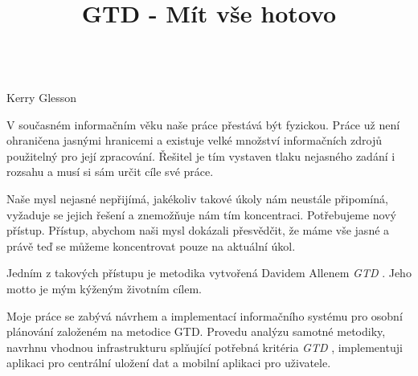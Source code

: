 \documentclass[thesis=B,czech]{FITthesis}[2012/06/26]
\title{GTD - Mít vše hotovo}
\newcommand{\GTD}{\textit{GTD }}
\begin{document}
 


\todototoc
\listoftodos



\begin{introduction}
\begin{center}
\textit{}\\
Kerry Glesson
\end{center}

V současném informačním věku naše práce přestává být fyzickou. Práce už není ohraničena jasnými hranicemi a existuje velké množství informačních zdrojů použitelný pro její zpracování. Řešitel je tím vystaven tlaku nejasného zadání i rozsahu a musí si sám určit cíle své práce.

Naše mysl nejasné nepřijímá, jakékoliv takové úkoly nám neustále připomíná, vyžaduje se jejich řešení a znemožňuje nám tím koncentraci. Potřebujeme nový přístup. Přístup, abychom naši mysl dokázali přesvědčit, že máme vše jasné a právě teď se můžeme koncentrovat pouze na aktuální úkol.

Jedním z takových přístupu je metodika vytvořená Davidem Allenem \GTD\cite{gtd}. Jeho motto \textit{} je mým kýženým životním cílem.

Moje práce se zabývá návrhem a implementací informačního systému pro osobní plánování založeném na metodice GTD. Provedu analýzu samotné metodiky, navrhnu vhodnou infrastrukturu splňující potřebná kritéria \GTD\cite{gtd}, implementuji aplikaci pro centrální uložení dat a mobilní aplikaci pro uživatele.    

	
\end{introduction}
\end{document}
